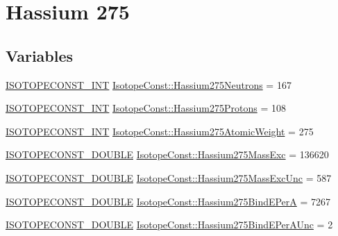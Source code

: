 \hypertarget{group___isotope_const-_hassium-_hs275}{}\section{Hassium 275}
\label{group___isotope_const-_hassium-_hs275}
\subsection*{Variables}
\begin{DoxyCompactItemize}
\item 
\mbox{\hyperlink{group___isotope_const-_macros_ga5f18360b3e99483a35c32d789e62621c}{I\+S\+O\+T\+O\+P\+E\+C\+O\+N\+S\+T\+\_\+\+I\+NT}} \mbox{\hyperlink{group___isotope_const-_hassium-_hs275_gad204d562904e13c94e352ca5254d54e9}{Isotope\+Const\+::\+Hassium275\+Neutrons}} = 167
\item 
\mbox{\hyperlink{group___isotope_const-_macros_ga5f18360b3e99483a35c32d789e62621c}{I\+S\+O\+T\+O\+P\+E\+C\+O\+N\+S\+T\+\_\+\+I\+NT}} \mbox{\hyperlink{group___isotope_const-_hassium-_hs275_gacfd0cac56b1f7d1a3b79c3f3e4dbf591}{Isotope\+Const\+::\+Hassium275\+Protons}} = 108
\item 
\mbox{\hyperlink{group___isotope_const-_macros_ga5f18360b3e99483a35c32d789e62621c}{I\+S\+O\+T\+O\+P\+E\+C\+O\+N\+S\+T\+\_\+\+I\+NT}} \mbox{\hyperlink{group___isotope_const-_hassium-_hs275_gac29aeac3d7fa4743554de7909dbd1afe}{Isotope\+Const\+::\+Hassium275\+Atomic\+Weight}} = 275
\item 
\mbox{\hyperlink{group___isotope_const-_macros_ga8f45a7272ce02c0b4c65c44636ed719a}{I\+S\+O\+T\+O\+P\+E\+C\+O\+N\+S\+T\+\_\+\+D\+O\+U\+B\+LE}} \mbox{\hyperlink{group___isotope_const-_hassium-_hs275_gabbdfffe6c1cd45d2ad80517186e3071f}{Isotope\+Const\+::\+Hassium275\+Mass\+Exc}} = 136620
\item 
\mbox{\hyperlink{group___isotope_const-_macros_ga8f45a7272ce02c0b4c65c44636ed719a}{I\+S\+O\+T\+O\+P\+E\+C\+O\+N\+S\+T\+\_\+\+D\+O\+U\+B\+LE}} \mbox{\hyperlink{group___isotope_const-_hassium-_hs275_gaa20ba343ca1c9f21b0491b00baf8247f}{Isotope\+Const\+::\+Hassium275\+Mass\+Exc\+Unc}} = 587
\item 
\mbox{\hyperlink{group___isotope_const-_macros_ga8f45a7272ce02c0b4c65c44636ed719a}{I\+S\+O\+T\+O\+P\+E\+C\+O\+N\+S\+T\+\_\+\+D\+O\+U\+B\+LE}} \mbox{\hyperlink{group___isotope_const-_hassium-_hs275_ga29e316bbaf77e3df5efebfda145bbf4e}{Isotope\+Const\+::\+Hassium275\+Bind\+E\+PerA}} = 7267
\item 
\mbox{\hyperlink{group___isotope_const-_macros_ga8f45a7272ce02c0b4c65c44636ed719a}{I\+S\+O\+T\+O\+P\+E\+C\+O\+N\+S\+T\+\_\+\+D\+O\+U\+B\+LE}} \mbox{\hyperlink{group___isotope_const-_hassium-_hs275_gafac167241debd3c84718033432c350d2}{Isotope\+Const\+::\+Hassium275\+Bind\+E\+Per\+A\+Unc}} = 2

\end{DoxyCompactItemize}
